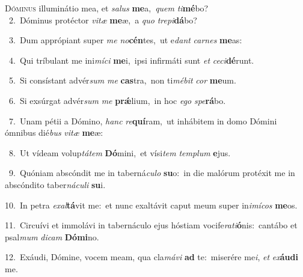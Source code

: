 \lettrine{\initial\textcolor{\initialcolor}{D}}{óminus} illuminátio mea, et \textit{sa}\-\textit{lus} \textbf{me}\-a,~\star \textit{quem} \textit{ti}\-\textbf{mé}bo?\\
{\numbfont\textcolor{\numbcolor}{~2.}}~Dóminus protéctor \textit{vi}\-\textit{tæ} \textbf{me}\-æ,~\star a \textit{quo} \textit{tre}\-\textit{pi}\textbf{dá}bo?\par
{\numbfont\textcolor{\numbcolor}{~3.}}~Dum apprópiant super \textit{me} \textit{no}\-\textbf{cén}tes,~\star ut e\textit{dant} \textit{car}\-\textit{nes} \textbf{me}\-as:\par
{\numbfont\textcolor{\numbcolor}{~4.}}~Qui tríbulant me ini\-\textit{mí}\-\textit{ci} \textbf{me}\-i,~\star ipsi infirmáti sunt \textit{et} \textit{ce}\-\textit{ci}\textbf{dé}runt.\par
{\numbfont\textcolor{\numbcolor}{~5.}}~Si consístant advér\textit{sum} \textit{me} \textbf{cas}\-tra,~\star non ti\-\textit{mé}\-\textit{bit} \textit{cor} \textbf{me}\-um.\par
{\numbfont\textcolor{\numbcolor}{~6.}}~Si exsúrgat advér\textit{sum} \textit{me} \textbf{prǽ}\-lium,~\star in hoc \textit{e}\-\textit{go} \textit{spe}\-\textbf{rá}bo.\par
{\numbfont\textcolor{\numbcolor}{~7.}}~Unam pétii a Dómino, \textit{hanc} \textit{re}\-\textbf{quí}ram,~\star ut inhábitem in domo Dómini ómnibus dié\textit{bus} \textit{vi}\-\textit{tæ} \textbf{me}\-æ:\par
{\numbfont\textcolor{\numbcolor}{~8.}}~Ut vídeam volup\-\textit{tá}\-\textit{tem} \textbf{Dó}\-mini,~\star et vísi\textit{tem} \textit{tem}\-\textit{plum} \textbf{e}\-jus.\par
{\numbfont\textcolor{\numbcolor}{~9.}}~Quóniam abscóndit me in taberná\-\textit{cu}\-\textit{lo} \textbf{su}\-o:~\star in die malórum protéxit me in abscóndito taber\-\textit{ná}\-\textit{cu}\textit{li} \textbf{su}\-i.\par
{\numbfont\textcolor{\numbcolor}{10.}}~In petra \textit{ex}\-\textit{al}\textbf{tá}vit me:~\star et nunc exaltávit caput meum super in\-\textit{i}\-\textit{mí}\textit{cos} \textbf{me}\-os.\par
{\numbfont\textcolor{\numbcolor}{11.}}~Circuívi et immolávi in tabernáculo ejus hóstiam vocife\-\textit{ra}\-\textit{ti}\textbf{ó}nis:~\star cantábo et psal\textit{mum} \textit{di}\-\textit{cam} \textbf{Dó}\-\textbf{mi}no.\par
{\numbfont\textcolor{\numbcolor}{12.}}~Exáudi, Dómine, vocem meam, qua cla\-\textit{má}\-\textit{vi} \textbf{ad} te:~\star miserére me\-\textit{i}\-, \textit{et} \textit{ex}\-\textbf{áu}\textbf{di} me.\par
